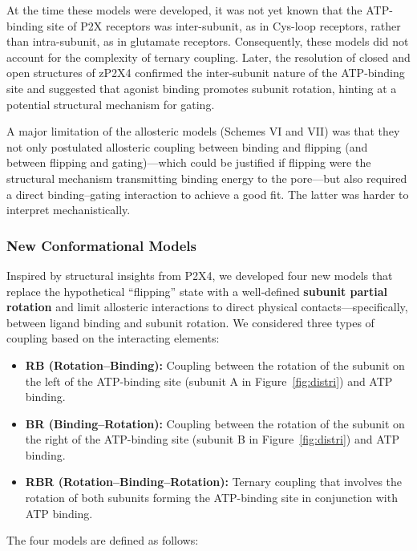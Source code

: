 \documentclass[pdflatex,sn-nature]{sn-jnl}%
\begin{document}
At the time these models were developed, it was not yet known that the ATP-binding site of P2X receptors was inter-subunit, as in Cys-loop receptors, rather than intra-subunit, as in glutamate receptors. Consequently, these models did not account for the complexity of ternary coupling. Later, the resolution of closed and open structures of zP2X4 \cite{cerrada_p2x, abierta_p2x} confirmed the inter-subunit nature of the ATP-binding site and suggested that agonist binding promotes subunit rotation, hinting at a potential structural mechanism for gating.

A major limitation of the allosteric models (Schemes VI and VII) was that they not only postulated allosteric coupling between binding and flipping (and between flipping and gating)—which could be justified if flipping were the structural mechanism transmitting binding energy to the pore—but also required a direct binding–gating interaction to achieve a good fit. The latter was harder to interpret mechanistically. 

\subsubsection{New Conformational Models}

Inspired by structural insights from P2X4, we developed four new models that replace the hypothetical “flipping” state with a well‐defined \textbf{subunit partial rotation} and limit allosteric interactions to direct physical contacts—specifically, between ligand binding and subunit rotation. We considered three types of coupling based on the interacting elements:

\begin{itemize}
    \item \textbf{RB (Rotation–Binding):} Coupling between the rotation of the subunit on the left of the ATP-binding site (subunit A in Figure~\ref{fig:distri}) and ATP binding.
    \item \textbf{BR (Binding–Rotation):} Coupling between the rotation of the subunit on the right of the ATP-binding site (subunit B in Figure~\ref{fig:distri}) and ATP binding.
    \item \textbf{RBR (Rotation–Binding–Rotation):} Ternary coupling that involves the rotation of both subunits forming the ATP-binding site in conjunction with ATP binding.
\end{itemize}

The four models are defined as follows:
\end{document}
